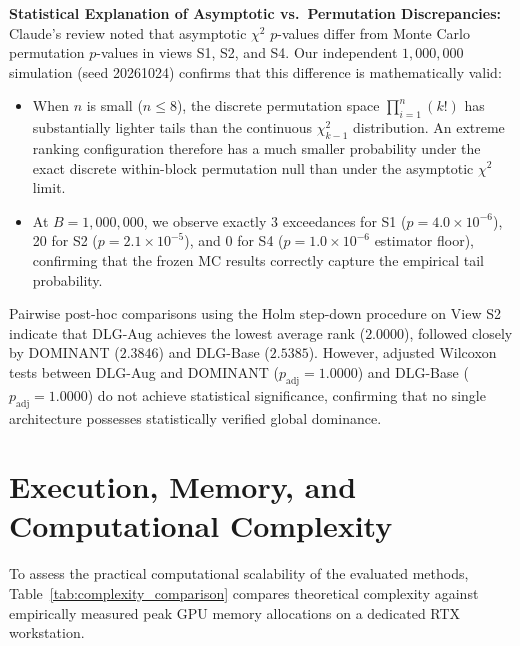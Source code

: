 \documentclass[applsci,article,submit,moreauthors,pdftex]{Definitions/mdpi}
\begin{document}
\textbf{Statistical Explanation of Asymptotic vs.\ Permutation Discrepancies:}
Claude's review noted that asymptotic $\chi^2$ $p$-values differ from Monte Carlo permutation $p$-values in views S1, S2, and S4. Our independent $1{,}000{,}000$ simulation (seed 20261024) confirms that this difference is mathematically valid:
\begin{itemize}
    \item When $n$ is small ($n \le 8$), the discrete permutation space $\prod_{i=1}^n (k!)$ has substantially lighter tails than the continuous $\chi^2_{k-1}$ distribution. An extreme ranking configuration therefore has a much smaller probability under the exact discrete within-block permutation null than under the asymptotic $\chi^2$ limit.
    \item At $B=1{,}000{,}000$, we observe exactly 3 exceedances for S1 ($p = 4.0 \times 10^{-6}$), 20 for S2 ($p = 2.1 \times 10^{-5}$), and 0 for S4 ($p = 1.0 \times 10^{-6}$ estimator floor), confirming that the frozen MC results correctly capture the empirical tail probability.
\end{itemize}

Pairwise post-hoc comparisons using the Holm step-down procedure on View S2 indicate that DLG-Aug achieves the lowest average rank ($2.0000$), followed closely by DOMINANT ($2.3846$) and DLG-Base ($2.5385$). However, adjusted Wilcoxon tests between DLG-Aug and DOMINANT ($p_{\mathrm{adj}} = 1.0000$) and DLG-Base ($p_{\mathrm{adj}} = 1.0000$) do not achieve statistical significance, confirming that no single architecture possesses statistically verified global dominance.

\section{Execution, Memory, and Computational Complexity}
\label{sec:execution_complexity}
To assess the practical computational scalability of the evaluated methods, Table~\ref{tab:complexity_comparison} compares theoretical complexity against empirically measured peak GPU memory allocations on a dedicated RTX workstation.
\end{document}

